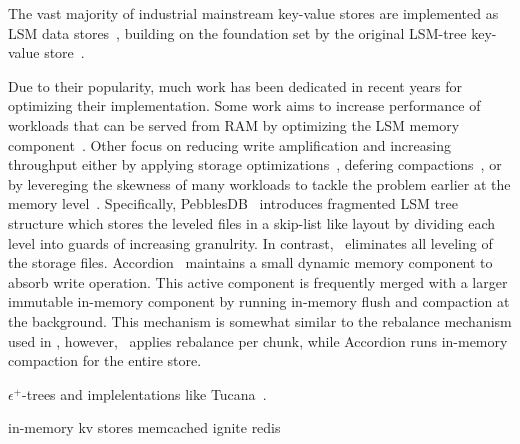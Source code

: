

The vast majority of industrial mainstream key-value stores are  implemented as LSM data
stores~\cite{Bigtable2008,hbase,cassandra2010,RocksDB, scylladb}, building on the foundation set by the original LSM-tree key-value store~\cite{O'Neil1996, Muth1998}.

Due to their popularity, much work has been dedicated in recent years for optimizing their implementation. Some work aims to increase performance of workloads that can be served from 
RAM by optimizing the LSM memory component~\cite{clsm2015, accordion}. Other focus on reducing write amplification and increasing throughput either by applying storage optimizations~\cite{WiscKey, PebblesDB}, defering compactions~\cite{PebblesDB, triad}, or by levereging the skewness of many workloads to tackle the problem earlier at the memory level~\cite{ accordion, triad}.
Specifically, PebblesDB~\cite{PebblesDB} introduces fragmented LSM tree structure which stores the leveled files in a skip-list like layout by dividing each level into guards of increasing granulrity. In contrast, \sys\ eliminates all leveling of the storage files. 
Accordion~\cite{accordion} maintains a small dynamic memory component to absorb write operation. This active component is frequently merged with a larger immutable in-memory component by running in-memory flush and compaction at the background. This mechanism is somewhat similar to the rebalance mechanism used in \sys, however, \sys\ applies rebalance per chunk, while Accordion runs in-memory compaction for the entire store.


$\epsilon^+$-trees and implelentations like Tucana~\cite{tucana}.

in-memory kv stores memcached ignite redis